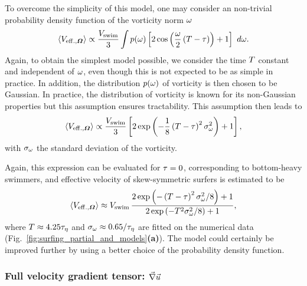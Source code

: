 To overcome the simplicity of this model, one may consider an non-trivial probability density function of the vorticity norm $\omega$
\begin{equation}
	\left\langle V_{\mathrm{eff.}, \boldsymbol{\varOmega}} \right\rangle \propto \frac{V_{\mathrm{swim}}}{3} \int p(\omega) \left[ 2 \cos \left( \frac{\omega}{2} \, (T - \tau) \right) + 1 \right] \,\, d \omega.
\end{equation}
Again, to obtain the simplest model possible, we consider the time $T$ constant and independent of $\omega$, even though this is not expected to be as simple in practice.
In addition, the distribution $p(\omega)$ of vorticity is then chosen to be Gaussian.
In practice, the distribution of vorticity is known for its non-Gaussian properties \citep{meneveau2011lagrangian} but this assumption ensures tractability.
This assumption then leads to
\begin{equation}
	\left\langle V_{\mathrm{eff.}, \boldsymbol{\varOmega}} \right\rangle \propto \frac{V_{\mathrm{swim}}}{3} \left[ 2 \exp \left( -\frac{1}{8} \left( T - \tau \right)^2 \sigma_{\omega}^2 \right) + 1 \right],
\end{equation}
with $\sigma_{\omega}$ the standard deviation of the vorticity.

Again, this expression can be evaluated for $\tau = 0$, corresponding to bottom-heavy swimmers, and effective velocity of skew-symmetric surfers is estimated to be
\begin{equation}\label{turb:eq:performance_surf_asym_final}
	\left\langle V_{\mathrm{eff.}, \boldsymbol{\varOmega}} \right\rangle \approx V_{\mathrm{swim}} \, \frac{ 2 \exp \left( -\left( T - \tau \right)^2 \sigma_{\omega}^2 / 8 \right) + 1}{2 \exp \left( -{T}^2 \sigma_{\omega}^2 / 8 \right) + 1},
\end{equation}
where $T \approx 4.25 \tau_{\eta}$ and $\sigma_{\omega} \approx 0.65 / \tau_{\eta}$ are fitted on the numerical data (Fig.~\ref{fig:surfing_partial_and_models}\textbf{(a)}).
The model could certainly be improved further by using a better choice of the probability density function.

\subsubsection{Full velocity gradient tensor: $\vec{\nabla} \vec{u}$}

